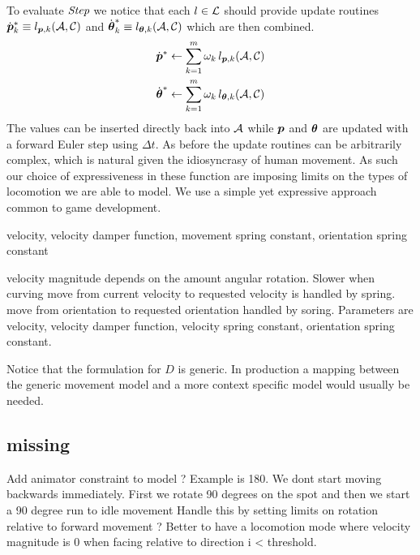 To evaluate $\textit{Step}$ we notice that each $l\in\mathcal{L}$ should provide update routines $\dot{\boldsymbol{p }}_k^* \equiv l_{\boldsymbol{p },k}(\mathcal{A},\mathcal{C})$ and $\dot{\boldsymbol{\theta }}_k^* \equiv l_{\boldsymbol{\theta }, k}(\mathcal{A},\mathcal{C})$ which are then combined.
\begin{subequations}
\begin{align}
\dot{\boldsymbol{p }}^*&\leftarrow \sum_{k=1}^{m}\omega_k \,l_{\boldsymbol{p },k}(\mathcal{A},\mathcal{C})\\
\dot{\boldsymbol{\theta }}^*&\leftarrow \sum_{k=1}^{m}\omega_k \,l_{\boldsymbol{\theta },k}(\mathcal{A},\mathcal{C})
\end{align}
\end{subequations}
The values can be inserted directly back into $\mathcal{A}$ while $\boldsymbol{p }$ and $\boldsymbol{\theta }$ are updated with a forward Euler step  using $\Delta{t}$. As before the update routines can be arbitrarily complex, which is natural given the idiosyncrasy of human movement. As such our choice of expressiveness in these function are imposing limits on the types of locomotion we are able to model. We use a simple yet expressive approach common to game development.   

velocity, velocity damper function, movement spring constant, orientation spring constant

velocity magnitude depends on the amount angular rotation. Slower when curving
move from current velocity to requested velocity is handled by spring.
move from orientation to requested orientation handled by soring.
Parameters are velocity, velocity damper function, velocity spring constant, orientation spring constant.


Notice that the formulation for $D$ is generic. In production a mapping between the generic movement model and a more context specific model would usually be needed. 

\subsection{missing}
Add animator constraint to model ? Example is 180. We dont start moving backwards immediately. First we rotate 90 degrees on the spot and then we start a 90 degree run to idle movement
Handle this by setting limits on rotation relative to forward movement ? Better to have a locomotion mode where velocity magnitude is 0 when facing relative to direction i < threshold.

